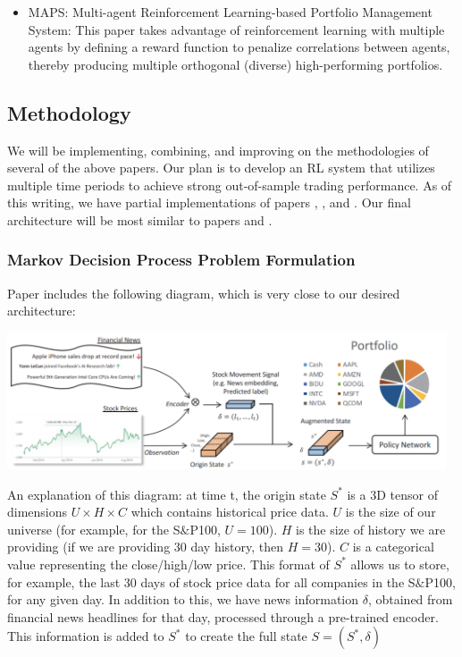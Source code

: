 \begin{itemize}
\item \cite{maps} MAPS: Multi-agent Reinforcement Learning-based Portfolio Management System: 
This paper takes advantage of reinforcement learning with multiple agents by defining a 
reward function to penalize correlations between agents, thereby producing multiple orthogonal 
(diverse) high-performing portfolios.

\end{itemize}

\subsection{Methodology}

We will be implementing, combining, and improving on the methodologies of several of the above papers. 
Our plan is to develop an RL system that utilizes multiple time periods to achieve strong out-of-sample 
trading performance. As of this writing, we have partial implementations of papers \cite{drl_mvo}, \cite{drl_modern_portfolio_theory}, and \cite{drl_framework}.
 Our final architecture will be most similar to papers \cite{rl_augmented_states} and \cite{drl_framework}.

\subsubsection{Markov Decision Process Problem Formulation}

Paper \cite{rl_augmented_states} includes the following diagram, which is very close to our desired 
architecture:

\begin{center}
\includegraphics[width=13cm]{formulation.png}
\end{center}

An explanation of this diagram: at time t, the origin state $S^*$ is a 3D tensor of dimensions $U \times H \times C$
which contains historical price data. $U$ is the size of our universe (for example, for the S$\&$P100, $U = 100$). 
$H$ is the size of history we are providing (if we are providing 30 day history, then $H = 30$). 
$C$ is a categorical value representing the close/high/low price. This format of $S^*$ allows us to store, 
for example, the last 30 days of stock price data for all companies in the S$\&$P100, for any given day. 
In addition to this, we have news information $\delta$, obtained from financial news headlines for that day, 
processed through a pre-trained encoder. This information is added to $S^*$ to create the full state 
$S = (S^*, \delta)$

